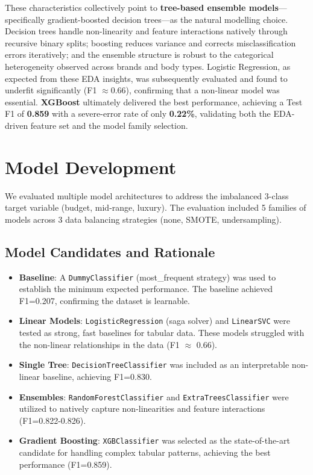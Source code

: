 \documentclass[12pt, a4paper]{article}
\begin{document}
These characteristics collectively point to \textbf{tree-based ensemble
models}---specifically gradient-boosted decision trees---as the natural
modelling choice.  Decision trees handle non-linearity and feature
interactions natively through recursive binary splits; boosting reduces
variance and corrects misclassification errors iteratively; and the
ensemble structure is robust to the categorical heterogeneity observed
across brands and body types.  Logistic Regression, as expected from
these EDA insights, was subsequently evaluated and found to underfit
significantly (F1 $\approx 0.66$), confirming that a non-linear model
was essential.  \textbf{XGBoost} ultimately delivered the best
performance, achieving a Test F1 of \textbf{0.859} with a severe-error
rate of only \textbf{0.22\%}, validating both the EDA-driven feature set
and the model family selection.

\newpage
\section{Model Development}
We evaluated multiple model architectures to address the imbalanced 3-class target variable (budget, mid-range, luxury). The evaluation included 5 families of models across 3 data balancing strategies (none, SMOTE, undersampling).

\subsection{Model Candidates and Rationale}
\begin{itemize}
    \item \textbf{Baseline}: A \texttt{DummyClassifier} (most\_frequent strategy) was used to establish the minimum expected performance. The baseline achieved F1=0.207, confirming the dataset is learnable.
    \item \textbf{Linear Models}: \texttt{LogisticRegression} (saga solver) and \texttt{LinearSVC} were tested as strong, fast baselines for tabular data. These models struggled with the non-linear relationships in the data (F1 $\approx$ 0.66).
    \item \textbf{Single Tree}: \texttt{DecisionTreeClassifier} was included as an interpretable non-linear baseline, achieving F1=0.830.
    \item \textbf{Ensembles}: \texttt{RandomForestClassifier} and \texttt{ExtraTreesClassifier} were utilized to natively capture non-linearities and feature interactions (F1=0.822-0.826).
    \item \textbf{Gradient Boosting}: \texttt{XGBClassifier} was selected as the state-of-the-art candidate for handling complex tabular patterns, achieving the best performance (F1=0.859).
\end{itemize}
\end{document}
